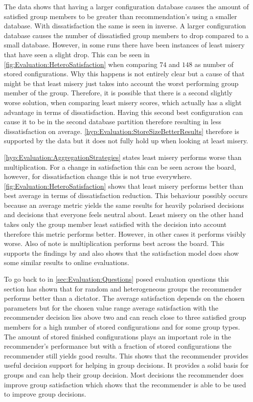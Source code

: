 The data shows that having a larger configuration database causes the amount of satisfied group members to be greater than recommendation's using a smaller database. With dissatisfaction the same is seen in inverse. A larger configuration database causes the number of dissatisfied group members to drop compared to a small database. However, in some runs there have been instances of least misery that have seen a slight drop. This can be seen in \autoref{fig:Evaluation:HeteroSatisfaction} when comparing $74$ and $148$ as number of stored configurations. Why this happens is not entirely clear but a cause of that might be that least misery just takes into account the worst performing group member of the group. Therefore, it is possible that there is a second slightly worse solution, when comparing least misery scores, which actually has a slight advantage in terms of dissatisfaction. Having this second best configuration can cause it to be in the second database partition therefore resulting in less dissatisfaction on average. \autoref{hyp:Evaluation:StoreSizeBetterResults} therefore is supported by the data but it does not fully hold up when looking at least misery.

\autoref{hyp:Evaluation:AggregationStrategies} states least misery performs worse than multiplication. For a change in satisfaction this can be seen across the board, however, for dissatisfaction change this is not true everywhere. \autoref{fig:Evaluation:HeteroSatisfaction} shows that least misery performs better than best average in terms of dissatisfaction reduction. This behaviour possibly occurs because an average metric yields the same results for heavily polarised decisions and decisions that everyone feels neutral about. Least misery on the other hand takes only the group member least satisfied with the decision into account therefore this metric performs better. However, in other cases it performs visibly worse. Also of note is multiplication performs best across the board. This supports the findings by \citeauthor{Masthoff2015} \cite[~p. 755f]{Masthoff2015} and also shows that the satisfaction model does show some similar results to online evaluations.

To go back to in \autoref{sec:Evaluation:Questions} posed evaluation questions this section has shown that for random and heterogeneous groups the recommender performs better than a dictator. The average satisfaction depends on the chosen parameters but for the chosen value range average satisfaction with the recommender decision lies above two and can reach close to three satisfied group members for a high number of stored configurations and for some group types. The amount of stored finished configurations plays an important role in the recommender's performance but with a fraction of stored configurations the recommender still yields good results. This shows that the recommender provides useful decision support for helping in group decisions. It provides a solid basis for groups and can help their group decision. Most decisions the recommender does improve group satisfaction which shows that the recommender is able to be used to improve group decisions.